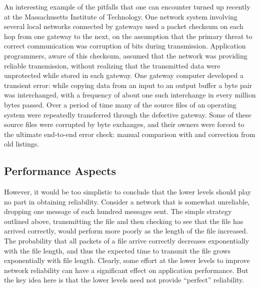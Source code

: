 \documentclass[a4paper,11pt,notitlepage,twoside,openright]{article}
\begin{document}
An interesting example of the pitfalls that one can encounter turned up
recently at the Massachusetts Institute of Technology. One network
system involving several local networks connected by gateways used a
packet checksum on each hop from one gateway to the next, on the
assumption that the primary threat to correct communication was
corruption of bits during transmission. Application programmers, aware
of this checksum, assumed that the network was providing reliable
transmission, without realizing that the transmitted data were
unprotected while stored in each gateway. One gateway computer
developed a transient error: while copying data from an input to an
output buffer a byte pair was interchanged, with a frequency of about
one such interchange in every million bytes passed. Over a period of
time many of the source files of an operating system were repeatedly
transferred through the defective gateway. Some of these source files
were corrupted by byte exchanges, and their owners were forced to the
ultimate end-to-end error check: manual comparison with and correction
from old listings.

\hypertarget{performance-aspects}{%
\subsection{Performance Aspects}\label{performance-aspects}}

However, it would be too simplistic to conclude that the lower levels
should play no part in obtaining reliability. Consider a network that is
somewhat unreliable, dropping one message of each hundred messages sent.
The simple strategy outlined above, transmitting the file and then
checking to see that the file has arrived correctly, would perform more
poorly as the length of the file increased. The probability that all
packets of a file arrive correctly decreases exponentially
with the file length, and thus the expected time to transmit the file
grows exponentially with file length. Clearly, some effort at the lower
levels to improve network reliability can have a significant effect on
application performance. But the key idea here is that the lower levels
need not provide ``perfect'' reliability.
\end{document}
